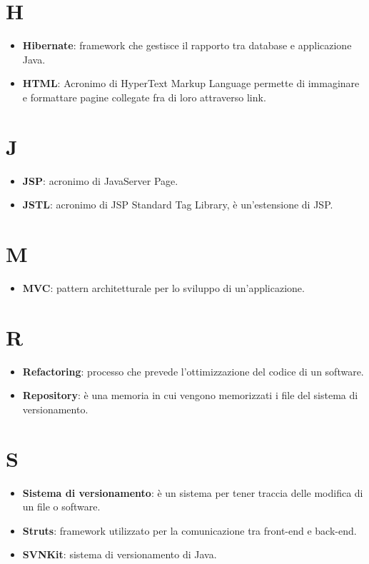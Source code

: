 \section*{H}
\begin{itemize}
\item \textbf{Hibernate}: framework che gestisce il rapporto tra database e applicazione Java.
\item \textbf{HTML}: Acronimo di HyperText Markup Language permette di immaginare e formattare pagine
collegate fra di loro attraverso link.
\end{itemize}


\section*{J}
\begin{itemize}
\item \textbf{JSP}: acronimo di JavaServer Page.
\item \textbf{JSTL}: acronimo di JSP Standard Tag Library, è un'estensione di JSP.
\end{itemize}

\section*{M}
\begin{itemize}
\item \textbf{MVC}: pattern architetturale per lo sviluppo di un'applicazione. 
\end{itemize}

\section*{R}
\begin{itemize}
\item \textbf{Refactoring}: processo che prevede l'ottimizzazione del codice di un software. 
\item \textbf{Repository}: è una memoria in cui vengono memorizzati i file del sistema di versionamento.

\end{itemize}


\section*{S}
\begin{itemize}
\item \textbf{Sistema di versionamento}: è un sistema per tener traccia delle modifica di un file o software.
\item \textbf{Struts}: framework utilizzato per la comunicazione tra front-end e back-end.
\item \textbf{SVNKit}: sistema di versionamento di Java.

\end{itemize}

